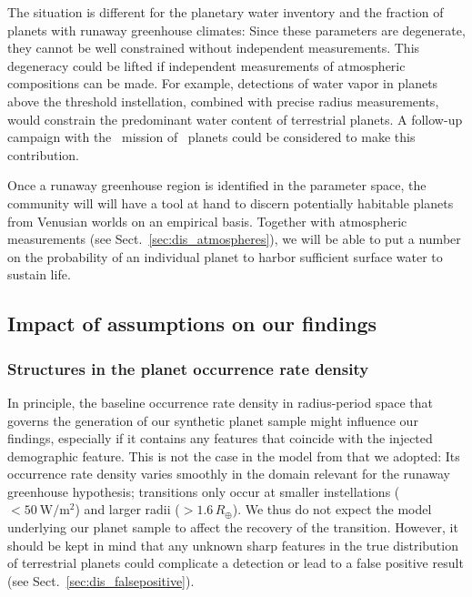 \documentclass[twocolumn]{aastex631}
\begin{document}
The situation is different for the planetary water inventory and the fraction of planets with runaway greenhouse climates:
Since these parameters are degenerate, they cannot be well constrained without independent measurements.
This degeneracy could be lifted if independent measurements of atmospheric compositions can be made.
For example, detections of water vapor in planets above the threshold instellation, combined with precise radius measurements, would constrain the predominant water content of terrestrial planets.
A follow-up campaign with the \ariel\ mission of \plato\ planets could be considered to make this contribution.

Once a runaway greenhouse region is identified in the parameter space, the community will will have a tool at hand to discern potentially habitable planets from Venusian worlds on an empirical basis.
Together with atmospheric measurements (see Sect.~\ref{sec:dis_atmospheres}), we will be able to put a number on the probability of an individual planet to harbor sufficient surface water to sustain life.


\subsection{Impact of assumptions on our findings}

\subsubsection{Structures in the planet occurrence rate density}
In principle, the baseline occurrence rate density in radius-period space that governs the generation of our synthetic planet sample might influence our findings, especially if it contains any features that coincide with the injected demographic feature.
This is not the case in the model from \citet{Bergsten2022} that we adopted: Its occurrence rate density varies smoothly in the domain relevant for the runaway greenhouse hypothesis; transitions only occur at smaller instellations ($< \SI{50}{\watt\per\meter\squared}$) and larger radii ($> 1.6\,R_\oplus$).
We thus do not expect the model underlying our planet sample to affect the recovery of the transition.
However, it should be kept in mind that any unknown sharp features in the true distribution of terrestrial planets could complicate a detection or lead to a false positive result (see Sect.~\ref{sec:dis_falsepositive}).
\end{document}
